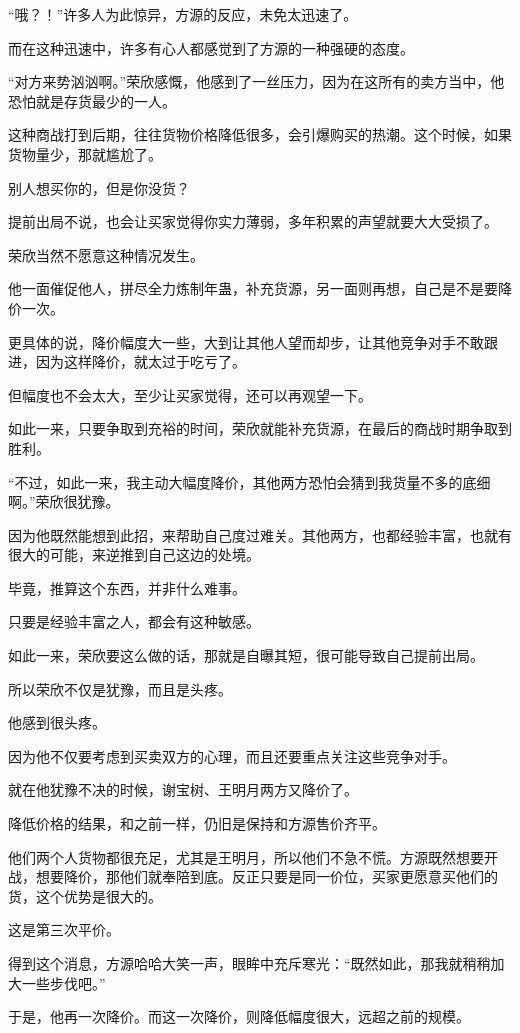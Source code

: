 \begin{this_body}
“哦？！”许多人为此惊异，方源的反应，未免太迅速了。

而在这种迅速中，许多有心人都感觉到了方源的一种强硬的态度。

“对方来势汹汹啊。”荣欣感慨，他感到了一丝压力，因为在这所有的卖方当中，他恐怕就是存货最少的一人。

这种商战打到后期，往往货物价格降低很多，会引爆购买的热潮。这个时候，如果货物量少，那就尴尬了。

别人想买你的，但是你没货？

提前出局不说，也会让买家觉得你实力薄弱，多年积累的声望就要大大受损了。

荣欣当然不愿意这种情况发生。

他一面催促他人，拼尽全力炼制年蛊，补充货源，另一面则再想，自己是不是要降价一次。

更具体的说，降价幅度大一些，大到让其他人望而却步，让其他竞争对手不敢跟进，因为这样降价，就太过于吃亏了。

但幅度也不会太大，至少让买家觉得，还可以再观望一下。

如此一来，只要争取到充裕的时间，荣欣就能补充货源，在最后的商战时期争取到胜利。

“不过，如此一来，我主动大幅度降价，其他两方恐怕会猜到我货量不多的底细啊。”荣欣很犹豫。

因为他既然能想到此招，来帮助自己度过难关。其他两方，也都经验丰富，也就有很大的可能，来逆推到自己这边的处境。

毕竟，推算这个东西，并非什么难事。

只要是经验丰富之人，都会有这种敏感。

如此一来，荣欣要这么做的话，那就是自曝其短，很可能导致自己提前出局。

所以荣欣不仅是犹豫，而且是头疼。

他感到很头疼。

因为他不仅要考虑到买卖双方的心理，而且还要重点关注这些竞争对手。

就在他犹豫不决的时候，谢宝树、王明月两方又降价了。

降低价格的结果，和之前一样，仍旧是保持和方源售价齐平。

他们两个人货物都很充足，尤其是王明月，所以他们不急不慌。方源既然想要开战，想要降价，那他们就奉陪到底。反正只要是同一价位，买家更愿意买他们的货，这个优势是很大的。

这是第三次平价。

得到这个消息，方源哈哈大笑一声，眼眸中充斥寒光：“既然如此，那我就稍稍加大一些步伐吧。”

于是，他再一次降价。而这一次降价，则降低幅度很大，远超之前的规模。


\end{this_body}
